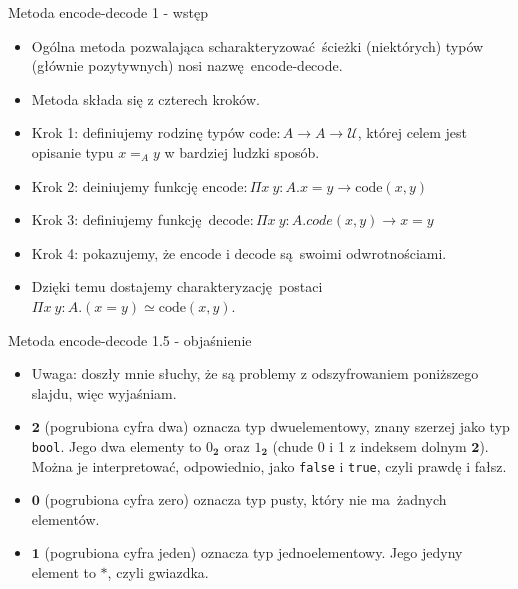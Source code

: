\documentclass{beamer}
\newcommand{\U}{\mathcal{U}}
\newcommand{\code}{\text{code}}
\newcommand{\encode}{\text{encode}}
\newcommand{\decode}{\text{decode}}
\begin{document}
\begin{frame}{Metoda encode-decode 1 - wstęp}
\begin{itemize}
	\item Ogólna metoda pozwalająca scharakteryzować ścieżki (niektórych) typów  (głównie pozytywnych) nosi nazwę encode-decode.
	\item Metoda składa się z czterech kroków.
	\item Krok 1: definiujemy rodzinę typów $\code : A \to A \to \U$, której celem jest opisanie typu $x =_A y$ w bardziej ludzki sposób.
	\item Krok 2: deiniujemy funkcję $\encode : \Pi x\ y : A. x = y \to \code(x, y)$
	\item Krok 3: definiujemy funkcję $\decode : \Pi x\ y : A. code(x, y) \to x = y$
	\item Krok 4: pokazujemy, że $\encode$ i $\decode$ są swoimi odwrotnościami.
	\item Dzięki temu dostajemy charakteryzację postaci $\Pi x\ y : A. (x = y) \simeq \code(x, y)$.
\end{itemize}
\end{frame}

\begin{frame}{Metoda encode-decode 1.5 - objaśnienie}
\begin{itemize}
	\item Uwaga: doszły mnie słuchy, że są problemy z odszyfrowaniem poniższego slajdu, więc wyjaśniam.
	\item $\textbf{2}$ (pogrubiona cyfra dwa) oznacza typ dwuelementowy, znany szerzej jako typ \texttt{bool}. Jego dwa elementy to $0_{\textbf{2}}$ oraz $1_{\textbf{2}}$ (chude 0 i 1 z indeksem dolnym $\textbf{2}$). Można je interpretować, odpowiednio, jako \texttt{false} i \texttt{true}, czyli prawdę i fałsz.
	\item $\textbf{0}$ (pogrubiona cyfra zero) oznacza typ pusty, który nie ma żadnych elementów.
	\item $\textbf{1}$ (pogrubiona cyfra jeden) oznacza typ jednoelementowy. Jego jedyny element to $*$, czyli gwiazdka.
\end{itemize}
\end{frame}
\end{document}
